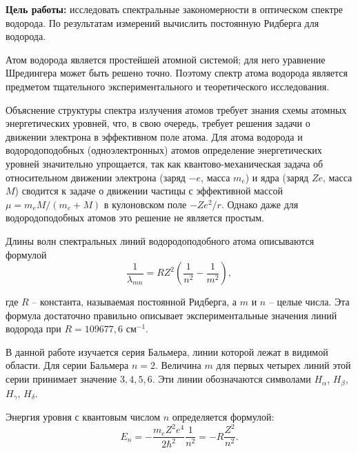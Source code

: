 


	
	\newpage
	
	\tableofcontents
	
	
	
	\newpage
	\textbf{Цель работы:} исследовать спектральные закономерности в оптическом спектре водорода. По результатам измерений вычислить постоянную Ридберга для водорода.
	
	Атом водорода является простейшей атомной системой; для него уравнение Шредингера может быть решено точно. Поэтому спектр атома водорода является предметом тщательного экспериментального и теоретического исследования.
	
	Объяснение структуры спектра излучения атомов требует знания схемы атомных энергетических уровней, что, в свою очередь, требует решения задачи о движении электрона в эффективном поле атома. Для атома водорода и водородоподобных (одноэлектронных) атомов определение энергетических уровней значительно упрощается, так как квантово-механическая задача об относительном движении электрона (заряд $-e$, масса $m_e$) и ядра (заряд $Ze$, масса $M$) сводится к задаче о движении частицы с эффективной массой $\mu = m_e M/(m_e + M)$ в кулоновском поле $-Ze^2/r$. Однако даже для водородоподобных атомов это решение не является простым.

	
	Длины волн спектральных линий водородоподобного атома описываются формулой
	\begin{equation}
		\frac{1}{\lambda_{mn}} = RZ^2\left(\frac{1}{n^2} - \frac{1}{m^2}\right),
	\end{equation}
	
	\noindent где $R$ -- константа, называемая постоянной Ридберга, а $m$ и $n$ -- целые числа. Эта формула достаточно правильно описывает экспериментальные значения линий водорода при $R = 109 677,6$ см$^{-1}$.
	
	В данной работе изучается серия Бальмера, линии которой лежат в видимой области. Для серии Бальмера $n = 2$. Величина $m$ для первых четырех линий этой серии принимает значение $3, 4, 5, 6$. Эти линии обозначаются символами $H_\alpha$, $H_\beta$, $H_\gamma$, $H_\delta$.
	
	Энергия уровня с квантовым числом $n$ определяется формулой:
	\begin{equation}
		E_n = -\frac{m_e Z^2 e^4}{2\hbar^2}\frac{1}{n^2} = -R\frac{Z^2}{n^2}.
	\end{equation}

